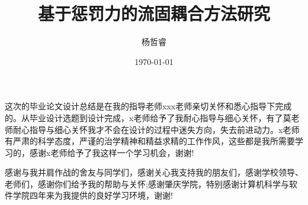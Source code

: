 \documentclass[bachelor, nocolorlinks, printoneside]{seuthesis} %
\title{基于惩罚力的流固耦合方法研究}{}{Penalty based Fluid-Structure Interaction}{}
\author{杨哲睿}{Zherui Yang}
\date{\today}
\begin{document}
\maketitle



\tableofcontents
\begin{Main}
  






\end{Main}
\begin{Acknowledgement}{}
这次的毕业论文设计总结是在我的指导老师xxx老师亲切关怀和悉心指导下完成的。从毕业设计选题到设计完成，x老师给予了我耐心指导与细心关怀，有了莫老师耐心指导与细心关怀我才不会在设计的过程中迷失方向，失去前进动力。x老师有严肃的科学态度，严谨的治学精神和精益求精的工作作风，这些都是我所需要学习的，感谢x老师给予了我这样一个学习机会，谢谢!

感谢与我并肩作战的舍友与同学们，感谢关心我支持我的朋友们，感谢学校领导、老师们，感谢你们给予我的帮助与关怀;感谢肇庆学院，特别感谢计算机科学与软件学院四年来为我提供的良好学习环境，谢谢!
\end{Acknowledgement}

\end{document}
